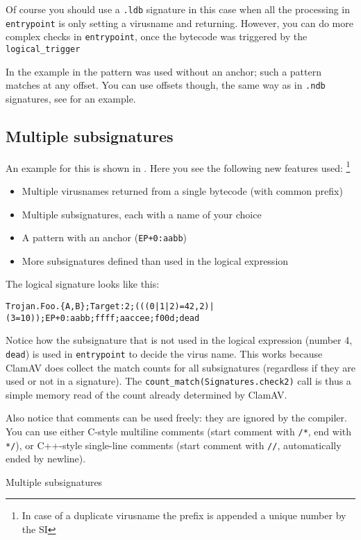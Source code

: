 Of course you should use a \verb+.ldb+ signature in this case when all the processing in \verb+entrypoint+
is only setting a virusname and returning.
However, you can do more complex checks in \verb+entrypoint+, once the bytecode was triggered by the \verb+logical_trigger+

In the example in  the pattern was used without an anchor; such a pattern matches at any offset.
You can use offsets though, the same way as in \verb+.ndb+ signatures, see  for an example.

\subsection{Multiple subsignatures}
An example for this is shown in .
Here you see the following new features used:
\footnote{In case of a duplicate virusname the
prefix is appended a unique number by the SI}
\begin{itemize}
 \item Multiple virusnames returned from a single bytecode (with common prefix)
 \item Multiple subsignatures, each with a name of your choice
 \item A pattern with an anchor (\verb|EP+0:aabb|)
 \item More subsignatures defined than used in the logical expression
\end{itemize}

The logical signature looks like this:

\noindent
{\footnotesize
\verb/Trojan.Foo.{A,B};Target:2;(((0|1|2)=42,2)|(3=10));EP+0:aabb;ffff;aaccee;f00d;dead/
}

Notice how the subsignature that is not used in the logical expression (number 4, \verb+dead+)
is used in \verb+entrypoint+ to decide the virus name.
This works because ClamAV does collect the match counts for all subsignatures (regardless if they are used or not in
a signature). The \verb+count_match(Signatures.check2)+ call is thus a simple memory read of the count already determined by ClamAV.

Also notice that comments can be used freely: they are ignored by the compiler. You can use either C-style multiline comments
(start comment with \verb+/*+, end with \verb+*/+), or C++-style single-line comments
(start comment with \verb+//+, automatically ended by newline).

\begin{program}

\caption{Multiple subsignatures}
\label{prg:multisig}
\end{program}

